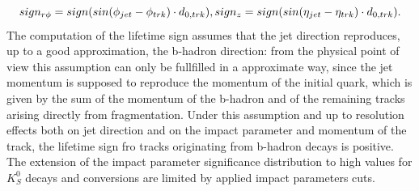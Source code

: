 \begin{equation}
sign_{r\phi} = sign(sin(\phi_{jet} - \phi_{trk})\cdot d_{0,trk}),\\
sign_{z} = sign(sin(\eta_{jet} - \eta_{trk})\cdot d_{0,trk}).\\
\end{equation}
The computation of the lifetime sign assumes that the jet direction reproduces, up to a good approximation, the b-hadron direction: from the physical point of view this assumption can only be fullfilled in a approximate way, since the jet momentum is supposed to reproduce the momentum of the initial quark, which is given by the sum of the momentum of the b-hadron and of the remaining tracks arising directly from fragmentation. Under this assumption and up to resolution effects both on jet direction and on the impact parameter and momentum of the track, the lifetime sign fro tracks originating from b-hadron decays is positive.
The extension of the impact parameter significance distribution to high values for $K^0_S$ decays and conversions are limited by applied impact parameters cuts.

